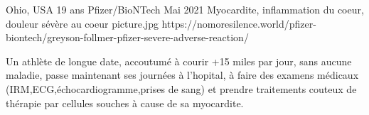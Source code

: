           {Ohio, USA}
          {19 ans}
          {Pfizer/BioNTech}
          {Mai 2021}
          {Myocardite, inflammation du coeur, douleur sévère au coeur
          }
          {picture.jpg}
          {https://nomoresilence.world/pfizer-biontech/greyson-follmer-pfizer-severe-adverse-reaction/}
          {

Un athlète de longue date, accoutumé à courir +15 miles par jour, sans aucune
maladie, passe maintenant ses journées à l'hopital, à faire des examens médicaux
(IRM,ECG,échocardiogramme,prises de sang) et prendre traitements couteux de
thérapie par cellules souches à cause de sa myocardite.


}
